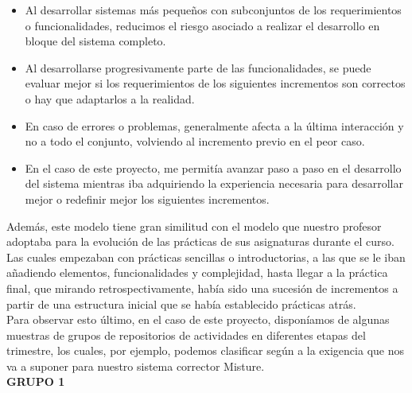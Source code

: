 \begin{itemize}
\item Al desarrollar sistemas más pequeños con subconjuntos de los requerimientos o funcionalidades, reducimos el riesgo asociado a realizar el desarrollo en bloque del sistema completo.\\

\item Al desarrollarse progresivamente parte de las funcionalidades, se puede evaluar mejor si los requerimientos de los siguientes incrementos son correctos o hay que adaptarlos a la realidad.\\

\item En caso de errores o problemas, generalmente afecta a la última interacción y no a todo el conjunto, volviendo al incremento previo en el peor caso.\\

\item En el caso de este proyecto, me permitía avanzar paso a paso en el desarrollo del sistema mientras iba adquiriendo la experiencia necesaria para desarrollar mejor o redefinir mejor los siguientes incrementos.\\
\end{itemize}


Además, este modelo tiene gran similitud con el modelo que nuestro profesor adoptaba para la evolución de las prácticas de sus asignaturas durante el curso. Las cuales empezaban con prácticas sencillas o introductorias, a las que se le iban añadiendo elementos, funcionalidades y complejidad, hasta llegar a la práctica final, que mirando retrospectivamente, había sido una sucesión de incrementos a partir de una estructura inicial que se había establecido prácticas atrás.\\


Para observar esto último, en el caso de este proyecto, disponíamos de algunas muestras de grupos de repositorios de actividades en diferentes etapas del trimestre, los cuales, por ejemplo, podemos clasificar según a la exigencia que nos va a suponer para nuestro sistema corrector Misture.\\

\textbf{GRUPO 1}


